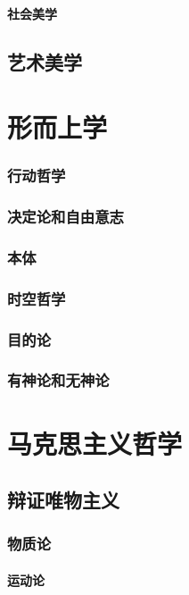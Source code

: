 \documentclass[UTF8]{../RepresentationUniverse}
\begin{document}
    \subsubsection{社会美学}

\section{艺术美学}




\chapter{形而上学}
    \subsection{行动哲学}
    \subsection{决定论和自由意志}
    \subsection{本体}
    \subsection{时空哲学}
    \subsection{目的论}
    \subsection{有神论和无神论}






\chapter{马克思主义哲学}

\section{辩证唯物主义}

\subsection{物质论}
    \subsubsection{运动论}
\end{document}
